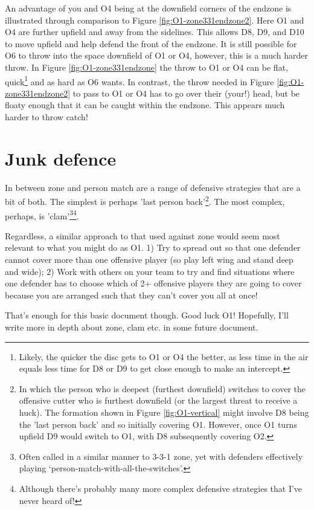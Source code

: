 \documentclass{tufte-handout}
\begin{document}
An advantage of you and O4 
being at the downfield 
corners 
of the endzone 
is illustrated through 
comparison to Figure \ref{fig:O1-zone331endzone2}.
Here O1 and O4
are further upfield
and away from the sidelines. 
This allows D8, D9, and D10 
to move upfield 
and help defend 
the front of the endzone. 
It is still possible for O6
to throw  
into the space downfield of O1
or O4, 
however, 
this is a much harder throw. 
In Figure \ref{fig:O1-zone331endzone} 
the throw to O1 or O4 can be 
flat,
quick\footnote{
Likely, the quicker the disc gets to O1 or O4
the better,
as less time in the air 
equals less time for D8 or D9 
to get close enough to make an intercept.}
and as hard as O6 wants. 
In contrast,
the throw needed in 
Figure \ref{fig:O1-zone331endzone2} 
to pass to O1 or O4 
has to go over their (your!) head,
but be floaty enough
that it can be caught 
within the endzone. 
This appears much harder to 
throw  catch!

\section{Junk defence}\label{sec:zone}
In between zone 
and person match 
are a range of  
defensive strategies 
that are a bit of both.
The simplest is 
perhaps 
'last person back'\footnote{
In which the person who is deepest 
(furthest downfield)
switches to cover the 
offensive cutter 
who is furthest downfield 
(or the largest threat
 to receive a huck). 
The formation 
shown in Figure \ref{fig:O1-vertical} 
might involve D8 
being the 'last person back'
and so initially covering O1.  
However, once O1 
turns upfield 
D9 would switch to O1, 
with D8 subsequently covering
O2.}. 
The most complex, 
perhaps, is
'clam'\footnote{
Often called in a similar manner 
to 3-3-1 zone, 
yet with defenders effectively playing 
`person-match-with-all-the-switches'.}\footnote{
Although there's probably many 
more complex 
defensive strategies 
that I've never heard of!}.

Regardless, 
a similar approach 
to that used against zone
would seem most relevant 
to what you might do as O1. 
1) Try to spread out 
so that one defender 
cannot cover more than 
one offensive player 
(so play left wing 
and stand deep 
and wide);
2) Work with others 
on your team to try 
and find situations where 
one defender 
has to choose 
which of 2+ offensive 
players they are going to cover 
because you are arranged
such that they can't cover you all
at once!
 
That's enough for this basic document though.  
Good luck O1! 
Hopefully, 
I'll write 
more in depth 
about  zone, 
clam etc. 
in some future document. 
\end{document}
